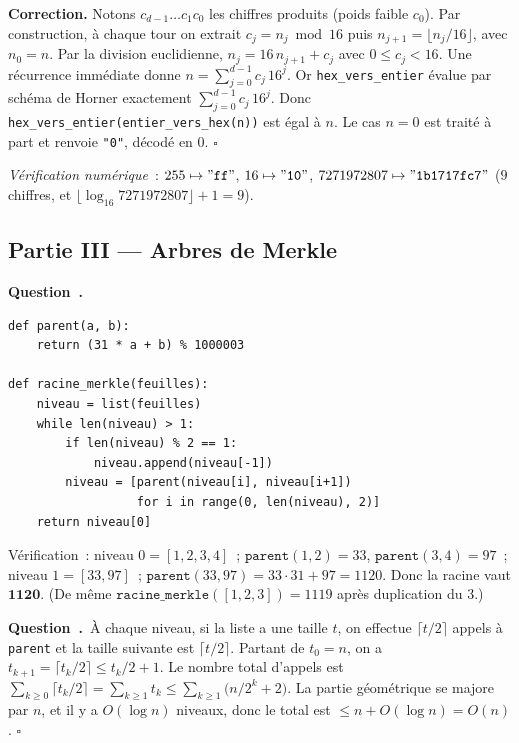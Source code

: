 \documentclass[11pt,a4paper]{article}
\newcounter{qcnt}
\newcommand{\Q}{\medskip\par\stepcounter{qcnt}\noindent\textbf{Question~\theqcnt.}~}
\newcommand{\code}[1]{\lstinline!#1!}
\begin{document}
\noindent\textbf{Correction.} Notons $c_{d-1}\dots c_1 c_0$ les chiffres produits (poids faible
$c_0$). Par construction, à chaque tour on extrait $c_j = n_j \bmod 16$ puis $n_{j+1} =
\lfloor n_j / 16\rfloor$, avec $n_0 = n$. Par la division euclidienne, $n_j = 16\,n_{j+1} + c_j$
avec $0 \le c_j < 16$. Une récurrence immédiate donne $n = \sum_{j=0}^{d-1} c_j\, 16^{j}$. Or
\code{hex_vers_entier} évalue par schéma de Horner exactement $\sum_{j=0}^{d-1} c_j\,16^{j}$. Donc
\code{hex_vers_entier(entier_vers_hex(n))} est égal à $n$. Le cas $n=0$ est traité à part et renvoie
\code{"0"}, décodé en $0$. $\square$

\medskip
\noindent\emph{Vérification numérique}~: $255 \mapsto \mathtt{"ff"}$, $16 \mapsto \mathtt{"10"}$,
$7271972807 \mapsto \mathtt{"1b1717fc7"}$ ($9$ chiffres, et $\lfloor\log_{16}
7271972807\rfloor+1 = 9$).

\subsection*{Partie III --- Arbres de Merkle}

\Q
\begin{lstlisting}
def parent(a, b):
    return (31 * a + b) % 1000003

def racine_merkle(feuilles):
    niveau = list(feuilles)
    while len(niveau) > 1:
        if len(niveau) % 2 == 1:
            niveau.append(niveau[-1])
        niveau = [parent(niveau[i], niveau[i+1])
                  for i in range(0, len(niveau), 2)]
    return niveau[0]
\end{lstlisting}
Vérification~: niveau $0 = [1,2,3,4]$~; $\mathtt{parent}(1,2)=33$, $\mathtt{parent}(3,4)=97$~; niveau
$1 = [33,97]$~; $\mathtt{parent}(33,97)=33\cdot31+97=1120$. Donc la racine vaut $\mathbf{1120}$.
(De même $\mathtt{racine\_merkle}([1,2,3])=1119$ après duplication du $3$.)

\Q À chaque niveau, si la liste a une taille $t$, on effectue $\lceil t/2\rceil$ appels à
\code{parent} et la taille suivante est $\lceil t/2\rceil$. Partant de $t_0 = n$, on a
$t_{k+1} = \lceil t_k/2\rceil \le t_k/2 + 1$. Le nombre total d'appels est
$\sum_{k\ge 0} \lceil t_k/2\rceil = \sum_{k\ge 1} t_k \le \sum_{k\ge 1}\bigl(n/2^{k} + 2\bigr)$.
La partie géométrique se majore par $n$, et il y a $O(\log n)$ niveaux, donc le total est
$\le n + O(\log n) = O(n)$. $\square$
\end{document}
